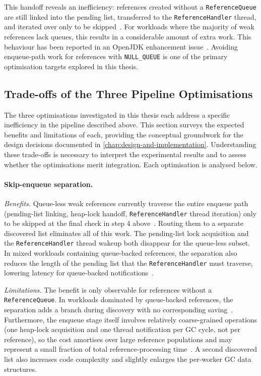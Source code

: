This handoff reveals an inefficiency: references created without a \texttt{ReferenceQueue} are still linked into the pending list, transferred to the \texttt{ReferenceHandler} thread, and iterated over only to be skipped~\cite{openjdk-reference-java,openjdk-zreferenceprocessor-cpp}. For workloads where the majority of weak references lack queues, this results in a considerable amount of extra work. This behaviour has been reported in an OpenJDK enhancement issue~\cite{JDK-8029205}. Avoiding enqueue-path work for references with \texttt{NULL\_QUEUE} is one of the primary optimisation targets explored in this thesis.

\subsection{Trade-offs of the Three Pipeline Optimisations}
\label{subsec:bg-refproc-tradeoffs}

The three optimisations investigated in this thesis each address a specific inefficiency in the pipeline described above. This section surveys the expected benefits and limitations of each, providing the conceptual groundwork for the design decisions documented in \cref{chap:design-and-implementation}. Understanding these trade-offs is necessary to interpret the experimental results and to assess whether the optimisations merit integration. Each optimisation is analysed below.

\paragraph{Skip-enqueue separation.}

\emph{Benefits.} Queue-less weak references currently traverse the entire enqueue path (pending-list linking, heap-lock handoff, \texttt{ReferenceHandler} thread iteration) only to be skipped at the final check in step 4 above~\cite{openjdk-reference-java,JDK-8029205}. Routing them to a separate discovered list eliminates all of this work. The pending-list lock acquisition and the \texttt{ReferenceHandler} thread wakeup both disappear for the queue-less subset. In mixed workloads containing queue-backed references, the separation also reduces the length of the pending list that the \texttt{ReferenceHandler} must traverse, lowering latency for queue-backed notifications~\cite{openjdk-reference-java,openjdk-zreferenceprocessor-cpp}.

\emph{Limitations.} The benefit is only observable for references without a \texttt{ReferenceQueue}. In workloads dominated by queue-backed references, the separation adds a branch during discovery with no corresponding saving~\cite{openjdk-zreferenceprocessor-cpp}. Furthermore, the enqueue stage itself involves relatively coarse-grained operations (one heap-lock acquisition and one thread notification per \ac{GC} cycle, not per reference), so the cost amortises over large reference populations and may represent a small fraction of total reference-processing time~\cite{openjdk-reference-java}. A second discovered list also increases code complexity and slightly enlarges the per-worker \ac{GC} data structures.

